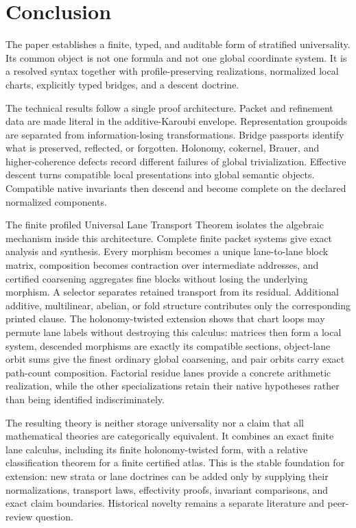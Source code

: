 \section{Conclusion}
\label{sec:publication-conclusion}

The paper establishes a finite, typed, and auditable form of stratified universality.  Its common object is not one formula and not one global coordinate system.  It is a resolved syntax together with profile-preserving realizations, normalized local charts, explicitly typed bridges, and a descent doctrine.

The technical results follow a single proof architecture.  Packet and refinement data are made literal in the additive-Karoubi envelope.  Representation groupoids are separated from information-losing transformations.  Bridge passports identify what is preserved, reflected, or forgotten.  Holonomy, cokernel, Brauer, and higher-coherence defects record different failures of global trivialization.  Effective descent turns compatible local presentations into global semantic objects.  Compatible native invariants then descend and become complete on the declared normalized components.

The finite profiled Universal Lane Transport Theorem isolates the algebraic mechanism inside this architecture.  Complete finite packet systems give exact analysis and synthesis.  Every morphism becomes a unique lane-to-lane block matrix, composition becomes contraction over intermediate addresses, and certified coarsening aggregates fine blocks without losing the underlying morphism.  A selector separates retained transport from its residual.  Additional additive, multilinear, abelian, or fold structure contributes only the corresponding printed clause.  The holonomy-twisted extension shows that chart loops may permute lane labels without destroying this calculus: matrices then form a local system, descended morphisms are exactly its compatible sections, object-lane orbit sums give the finest ordinary global coarsening, and pair orbits carry exact path-count composition.  Factorial residue lanes provide a concrete arithmetic realization, while the other specializations retain their native hypotheses rather than being identified indiscriminately.

The resulting theory is neither storage universality nor a claim that all mathematical theories are categorically equivalent.  It combines an exact finite lane calculus, including its finite holonomy-twisted form, with a relative classification theorem for a finite certified atlas.  This is the stable foundation for extension: new strata or lane doctrines can be added only by supplying their normalizations, transport laws, effectivity proofs, invariant comparisons, and exact claim boundaries.  Historical novelty remains a separate literature and peer-review question.
